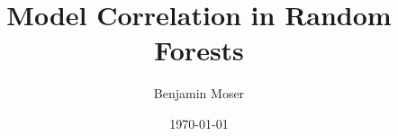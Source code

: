 \documentclass[
    a4paper, %
	fontsize=10pt, %
	twoside=false, %
]{kaobook}
\begin{document}

\title[Model Correlation in Random Forests]{Model Correlation in Random Forests}
\author[BM]{Benjamin Moser}
\date{\today}


\frontmatter %



	
	
	
	
	
	
	

\end{document}
